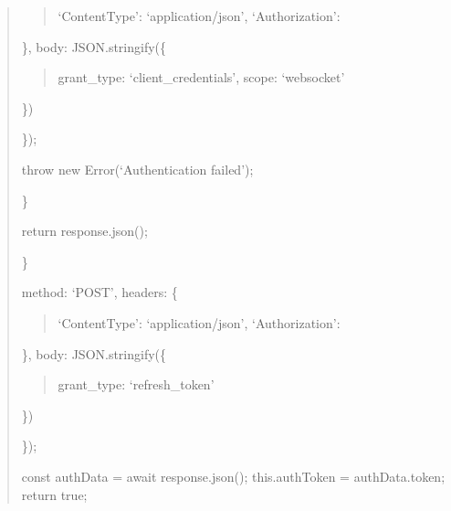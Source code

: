 \documentclass[letterpaper,10pt,english]{sphinxmanual}
\begin{document}
\begin{quote}
\begin{description}
\begin{description}
\begin{quote}
\sphinxAtStartPar
‘Content\sphinxhyphen{}Type’: ‘application/json’,
‘Authorization’: 
\end{quote}

\sphinxAtStartPar
\},
body: JSON.stringify(\{
\begin{quote}

\sphinxAtStartPar
grant\_type: ‘client\_credentials’,
scope: ‘websocket’
\end{quote}

\sphinxAtStartPar
\})

\end{description}

\sphinxAtStartPar
\});
\begin{description}
\sphinxAtStartPar
throw new Error(‘Authentication failed’);

\end{description}

\sphinxAtStartPar
\}

\sphinxAtStartPar
return response.json();

\end{description}

\sphinxAtStartPar
\}
\begin{description}
\begin{description}
\begin{description}
\sphinxAtStartPar
method: ‘POST’,
headers: \{
\begin{quote}

\sphinxAtStartPar
‘Content\sphinxhyphen{}Type’: ‘application/json’,
‘Authorization’: 
\end{quote}

\sphinxAtStartPar
\},
body: JSON.stringify(\{
\begin{quote}

\sphinxAtStartPar
grant\_type: ‘refresh\_token’
\end{quote}

\sphinxAtStartPar
\})

\end{description}

\sphinxAtStartPar
\});
\begin{description}
\sphinxAtStartPar
const authData = await response.json();
this.authToken = authData.token;
return true;


\end{description}
\end{description}
\end{description}
\end{quote}
\end{document}
